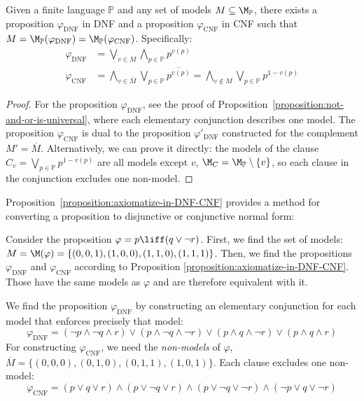 \begin{proposition} \label{proposition:axiomatize-in-DNF-CNF}
    Given a finite language $\mathbb P$ and any set of models $M \subseteq \M_\mathbb P$, there exists a proposition $\varphi_{\mathrm{DNF}}$ in DNF and a proposition $\varphi_{\mathrm{CNF}}$ in CNF such that $M = \M_\mathbb P(\varphi_{\mathrm{DNF}}) = \M_\mathbb P(\varphi_{\mathrm{CNF}})$. Specifically:
\begin{align*}
    \varphi_{\mathrm{\mathrm{DNF}}} &= \bigvee_{v \in M} \bigwedge_{p \in \mathbb P} p^{v(p)} \\
    \varphi_{\mathrm{CNF}} &= \bigwedge_{v \in \overline{M}} \bigvee_{p \in \mathbb P} \overline{p^{v(p)}} = \bigwedge_{v \notin M} \bigvee_{p \in \mathbb P} p^{1-v(p)}
\end{align*}
\end{proposition}

\begin{proof}
    For the proposition $\varphi_{\mathrm{DNF}}$, see the proof of Proposition~\ref{proposition:not-and-or-is-universal}, where each elementary conjunction describes one model. The proposition $\varphi_{\mathrm{CNF}}$ is dual to the proposition $\varphi'_{\mathrm{DNF}}$ constructed for the complement $M' = \overline{M}$. Alternatively, we can prove it directly: the models of the clause $C_v = \bigvee_{p \in \mathbb P} p^{1-v(p)}$ are all models except $v$, $\M_C = \M_\mathbb P \setminus \{v\}$, so each clause in the conjunction excludes one non-model.
\end{proof}

Proposition~\ref{proposition:axiomatize-in-DNF-CNF} provides a method for converting a proposition to disjunctive or conjunctive normal form:

\begin{example}
    Consider the proposition $\varphi = p \liff (q \lor \neg r)$. First, we find the set of models: $M = \M(\varphi) = \{(0,0,1),(1,0,0),(1,1,0),(1,1,1)\}$. Then, we find the propositions $\varphi_{\mathrm{DNF}}$ and $\varphi_{\mathrm{CNF}}$ according to Proposition \ref{proposition:axiomatize-in-DNF-CNF}. Those have the same models as $\varphi$ and are therefore equivalent with it.

    We find the proposition $\varphi_{\mathrm{DNF}}$ by constructing an elementary conjunction for each model that enforces precisely that model:
    $$
    \varphi_{\mathrm{DNF}} = (\neg p \land \neg q \land r) \lor (p \land \neg q \land \neg r) \lor (p \land q \land \neg r) \lor (p \land q \land r)
    $$
    For constructing $\varphi_{\mathrm{CNF}}$, we need the \emph{non-models} of $\varphi$, $\overline{M} = \{(0,0,0),(0,1,0),(0,1,1),(1,0,1)\}$. Each clause excludes one non-model:
    $$
    \varphi_{\mathrm{CNF}} = (p \lor q \lor r) \land (p \lor \neg q \lor r) \land (p \lor \neg q \lor \neg r) \land (\neg p \lor q \lor \neg r)
    $$   
\end{example}

